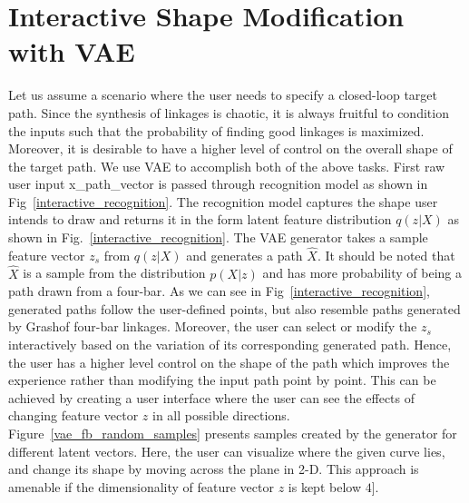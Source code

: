 \section{Interactive Shape Modification with VAE}
Let us assume a scenario where the user needs to specify a closed-loop target path.
Since the synthesis of linkages is chaotic, it is always fruitful to condition the inputs such that the probability of finding good linkages is maximized.
Moreover, it is desirable to have a higher level of control on the overall shape of the target path.
We use VAE to accomplish both of the above tasks.
First raw user input \ac{x_path_vector} is passed through recognition model as shown in Fig~\ref{interactive_recognition}.
The recognition model captures the shape user intends to draw and returns it in the form latent feature distribution $q(z|X)$ as shown in Fig.~\ref{interactive_recognition}.
The VAE generator takes a sample feature vector $z_s$ from $q(z|X)$ and generates a path $\hat{X}$.
It should be noted that $\hat{X}$ is a sample from the distribution $p(X|z)$ and has more probability of being a path drawn from a four-bar.
As we can see in Fig~\ref{interactive_recognition}, generated paths follow the user-defined points, but also resemble paths generated by Grashof four-bar linkages.
Moreover, the user can select or modify the $z_s$ interactively based on the variation of its corresponding generated path.
Hence, the user has a higher level control on the shape of the path which improves the experience rather than modifying the input path point by point.
This can be achieved by creating a user interface where the user can see the effects of changing feature vector $z$ in all possible directions.
Figure~\ref{vae_fb_random_samples} presents samples created by the generator for different latent vectors.
Here, the user can visualize where the given curve lies, and change its shape by moving across the plane in 2-D.
This approach is amenable if the dimensionality of feature vector $z$ is kept below $4$].
